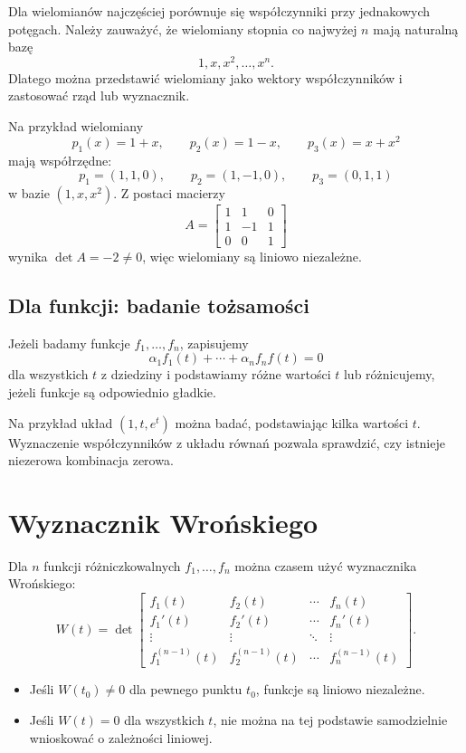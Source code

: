 \documentclass{article}
\begin{document}
Dla wielomianów najczęściej porównuje się współczynniki przy jednakowych potęgach. Należy zauważyć, że wielomiany stopnia co najwyżej $n$ mają naturalną bazę
\[
1,x,x^2,\ldots,x^n.
\]
Dlatego można przedstawić wielomiany jako wektory współczynników i zastosować rząd lub wyznacznik.

Na przykład wielomiany
\[
p_1(x)=1+x,\qquad p_2(x)=1-x,\qquad p_3(x)=x+x^2
\]
mają współrzędne:
\[
p_1=(1,1,0),\qquad p_2=(1,-1,0),\qquad p_3=(0,1,1)
\]
w bazie $(1,x,x^2)$.
Z postaci macierzy
\[
A=
\begin{bmatrix}
1&1&0\\
1&-1&1\\
0&0&1
\end{bmatrix}
\]
wynika $\det A=-2\neq0$, więc wielomiany są liniowo niezależne.

\subsection{Dla funkcji: badanie tożsamości}
Jeżeli badamy funkcje $f_1,\ldots,f_n$, zapisujemy
\[
\alpha_1f_1(t)+\cdots+\alpha_nf_nf(t)=0
\]
dla wszystkich $t$ z dziedziny i podstawiamy różne wartości $t$ lub różnicujemy, jeżeli funkcje są odpowiednio gładkie.

Na przykład układ $(1,t,e^t)$ można badać, podstawiając kilka wartości $t$. Wyznaczenie współczynników z układu równań pozwala sprawdzić, czy istnieje niezerowa kombinacja zerowa.

\section{Wyznacznik Wrońskiego}

Dla $n$ funkcji różniczkowalnych $f_1,\ldots,f_n$ można czasem użyć wyznacznika Wrońskiego:
\[
W(t)=
\det
\begin{bmatrix}
f_1(t)&f_2(t)&\cdots&f_n(t)\\
f_1'(t)&f_2'(t)&\cdots&f_n'(t)\\
\vdots&\vdots&\ddots&\vdots\\
f_1^{(n-1)}(t)&f_2^{(n-1)}(t)&\cdots&f_n^{(n-1)}(t)
\end{bmatrix}.
\]

\begin{itemize}
    \item Jeśli $W(t_0)\neq0$ dla pewnego punktu $t_0$, funkcje są liniowo niezależne.
    \item Jeśli $W(t)=0$ dla wszystkich $t$, nie można na tej podstawie samodzielnie wnioskować o zależności liniowej.
\end{itemize}
\end{document}
